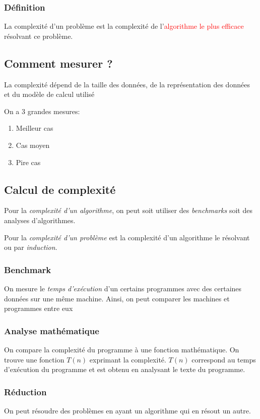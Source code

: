 \documentclass{report}
\begin{document}
\subsubsection{Définition}
La complexité d'un problème est la complexité de l'\textcolor{red}{algorithme le plus efficace} résolvant ce problème.

\subsection{Comment mesurer ?}
La complexité dépend de la taille des données, de la représentation des données et du modèle de calcul utilisé \par
On a 3 grandes mesures:
\begin{enumerate}
\item Meilleur cas
\item Cas moyen
\item Pire cas
\end{enumerate}

\subsection{Calcul de complexité}
Pour la \textit{complexité d'un algorithme}, on peut soit utiliser des \textit{benchmarks} soit des analyses d'algorithmes.\par
Pour la \textit{complexité d'un problème} est la complexité d'un algorithme le résolvant ou par \textit{induction}.

\subsubsection{Benchmark}
On mesure le \textit{temps d'exécution} d'un certains programmes avec des certaines données sur une même machine. Ainsi, on peut comparer les machines et programmes entre eux

\subsubsection{Analyse mathématique}
On compare la complexité du programme à une fonction mathématique. On trouve une fonction $T(n)$ exprimant la complexité. $T(n)$ correspond au temps d'exécution du programme et est obtenu en analysant le texte du programme.

\subsubsection{Réduction}
On peut résoudre des problèmes en ayant un algorithme qui en résout un autre.
\end{document}
